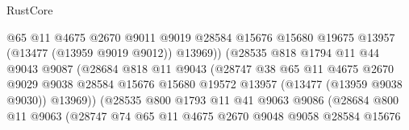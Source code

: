 \begin{lexlean}{RustCore}
\begin{coremodule}
                                    @65
                                    @11
                                    @4675
                                    @2670
                                    @9011
                                    @9019
                                    @28584
                                    @15676
                                    @15680
                                    @19675
                                    @13957
                                    (@13477 (@13959 @9019 @9012))
                                    @13969))
                                (@28535
                                  @818
                                  @1794
                                  @11
                                  @44
                                  @9043
                                  @9087
                                  (@28684
                                    @818
                                    @11
                                    @9043
                                    (@28747
                                      @38
                                      @65
                                      @11
                                      @4675
                                      @2670
                                      @9029
                                      @9038
                                      @28584
                                      @15676
                                      @15680
                                      @19572
                                      @13957
                                      (@13477 (@13959 @9038 @9030))
                                      @13969))
                                  (@28535
                                    @800
                                    @1793
                                    @11
                                    @41
                                    @9063
                                    @9086
                                    (@28684
                                      @800
                                      @11
                                      @9063
                                      (@28747
                                        @74
                                        @65
                                        @11
                                        @4675
                                        @2670
                                        @9048
                                        @9058
                                        @28584
                                        @15676

\end{coremodule}
\end{lexlean}

